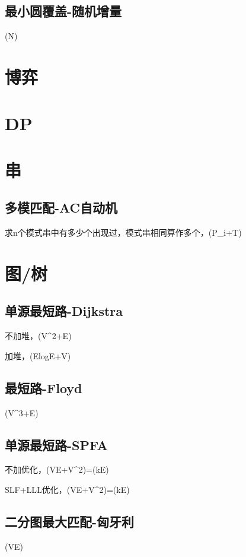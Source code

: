 \documentclass[10pt]{article}
\begin{document}
\subsection{最小圆覆盖-随机增量}
(N)

\section{博弈}
\section{DP}
\section{串}
\subsection{多模匹配-AC自动机}
求n个模式串中有多少个出现过，模式串相同算作多个，(\sum P_i+T)

\section{图/树}
\subsection{单源最短路-Dijkstra}
不加堆，(V^2+E)

加堆，(ElogE+V)


\subsection{最短路-Floyd}
(V^3+E)


\subsection{单源最短路-SPFA}
不加优化，(VE+V^2)=(kE)

SLF+LLL优化，(VE+V^2)=(kE)


\subsection{二分图最大匹配-匈牙利}
(VE)

\end{document}
